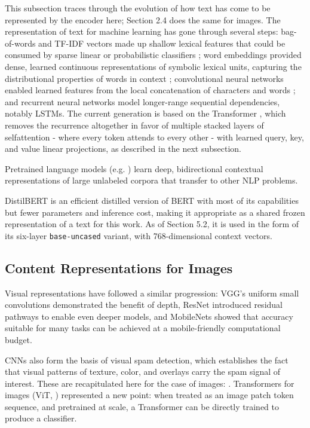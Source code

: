 \documentclass[10pt,twoside]{article}
\newcommand{\code}[1]{\texttt{#1}}
\begin{document}
This subsection traces through the evolution of how text has come to be represented by the encoder here; Section 2.4 does the same for images. The representation of text for machine learning has gone through several steps: bag-of-words and TF-IDF vectors made up shallow lexical features that could be consumed by sparse linear or probabilistic classifiers \citep{janez2023review}; word embeddings provided dense, learned continuous representations of symbolic lexical units, capturing the distributional properties of words in context \citep{mikolov2013word}; convolutional neural networks enabled learned features from the local concatenation of characters \citep{zhang2015charcnn} and words \citep{kim2014cnn}; and recurrent neural networks \citep{hochreiter1997lstm} model longer-range sequential dependencies, notably LSTMs. The current generation \citep{devlin2019bert,liu2019roberta,sanh2019distilbert} is based on the Transformer \citep{vaswani2017attention}, which removes the recurrence altogether in favor of multiple stacked layers of selfattention - where every token attends to every other - with learned query, key, and value linear projections, as described in the next subsection.

Pretrained language models (e.g. \citep{devlin2019bert,liu2019roberta}) learn deep, bidirectional contextual representations of large unlabeled corpora that transfer to other NLP problems.

DistilBERT \citep{sanh2019distilbert} is an efficient distilled version of BERT with most of its capabilities but fewer parameters and inference cost, making it appropriate as a shared frozen representation of a text for this work. As of Section 5.2, it is used in the form of its six-layer \code{base-uncased} variant, with 768-dimensional context vectors.

\subsection{Content Representations for Images}\label{sec:2.4}

Visual representations have followed a similar progression: VGG's \citep{simonyan2015vgg} uniform small convolutions demonstrated the benefit of depth, ResNet \citep{he2016resnet} introduced residual pathways to enable even deeper models, and MobileNets \citep{howard2017mobilenets} showed that accuracy suitable for many tasks can be achieved at a mobile-friendly computational budget.

CNNs also form the basis of visual spam detection, which establishes the fact that visual patterns of texture, color, and overlays carry the spam signal of interest. These are recapitulated here for the case of images: \citep{annadatha2018image}. Transformers for images (ViT, \citep{dosovitskiy2021vit}) represented a new point: when treated as an image patch token sequence, and pretrained at scale, a Transformer can be directly trained to produce a classifier.
\end{document}
